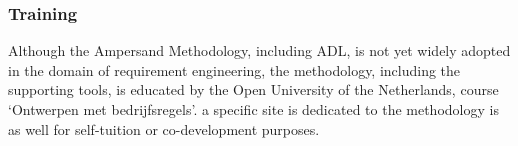\subsubsection{Training}
Although the Ampersand Methodology, including ADL, is not yet widely adopted in the domain of requirement engineering, the methodology, including the supporting tools, is educated by the Open University of the Netherlands, course `Ontwerpen met bedrijfsregels'. a specific site is dedicated to the methodology is as well for self-tuition or co-development purposes.

\noindent



